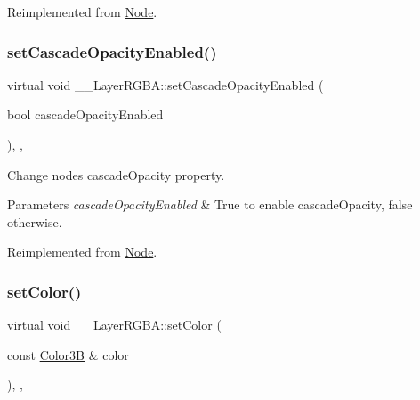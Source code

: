 Reimplemented from \hyperlink{classNode_a56b08f1d19bb0345f6fb40d9a3e3b4a4}{Node}.

\mbox{\label{class____LayerRGBA_ab25a8418f19d14a064f8c8072b3468a5}} 
\subsubsection{\texorpdfstring{set\+Cascade\+Opacity\+Enabled()}{setCascadeOpacityEnabled()}\hspace{0.1cm}{\footnotesize\ttfamily [2/2]}}
{\footnotesize\ttfamily virtual void \+\_\+\+\_\+\+Layer\+R\+G\+B\+A\+::set\+Cascade\+Opacity\+Enabled (\begin{DoxyParamCaption}\item[{bool}]{cascade\+Opacity\+Enabled }\end{DoxyParamCaption})\hspace{0.3cm}{\ttfamily [inline]}, {\ttfamily [override]}, {\ttfamily [virtual]}}

Change node\textquotesingle{}s cascade\+Opacity property. 
\begin{DoxyParams}{Parameters}
{\em cascade\+Opacity\+Enabled} & True to enable cascade\+Opacity, false otherwise. \\
\hline
\end{DoxyParams}


Reimplemented from \hyperlink{classNode_a56b08f1d19bb0345f6fb40d9a3e3b4a4}{Node}.

\mbox{\label{class____LayerRGBA_aed346ddd9f7f7eab1e3d1417fa9a9831}} 
\subsubsection{\texorpdfstring{set\+Color()}{setColor()}\hspace{0.1cm}{\footnotesize\ttfamily [1/2]}}
{\footnotesize\ttfamily virtual void \+\_\+\+\_\+\+Layer\+R\+G\+B\+A\+::set\+Color (\begin{DoxyParamCaption}\item[{const \hyperlink{structColor3B}{Color3B} \&}]{color }\end{DoxyParamCaption})\hspace{0.3cm}{\ttfamily [inline]}, {\ttfamily [override]}, {\ttfamily [virtual]}}

